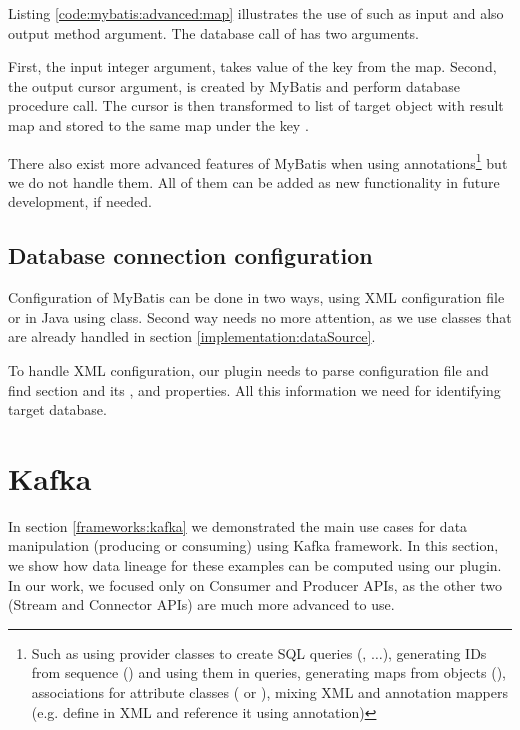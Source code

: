 Listing \ref{code:mybatis:advanced:map} illustrates the use of such  as
input and also output method argument.
The database call of  has two arguments.

First, the input integer argument, takes value of the  key from the map.
Second, the output cursor argument, is created by MyBatis and perform database procedure call.
The cursor is then transformed to list of target object
with result map  and stored to the same map under the key .


There also exist more advanced features of MyBatis when using annotations\footnote{
  Such as using provider classes to create SQL queries (, $\ldots$),
  generating IDs from sequence () and using them in queries,
  generating maps from objects (),
  associations for attribute classes ( or ),
  mixing XML and annotation mappers (e.g. define  in XML and reference it
  using  annotation)}
but we do not handle them. All of them can be added as new functionality in future development,
if needed.




\subsection{Database connection configuration}

Configuration of MyBatis can be done in two ways, using XML configuration file
or in Java using  class. Second way needs no more attention,
as we use  classes that are already handled in section \ref{implementation:dataSource}.

To handle XML configuration, our plugin needs to parse configuration file and find 
section and its ,  and  properties. All this
information we need for identifying target database.




\section{Kafka}

In section \ref{frameworks:kafka} we demonstrated the main use cases
for data manipulation (producing or consuming) using Kafka framework.
In this section, we show how data lineage for these examples can be computed
using our plugin. In our work, we focused only on Consumer and Producer APIs,
as the other two (Stream and Connector APIs) are much more advanced to use.

